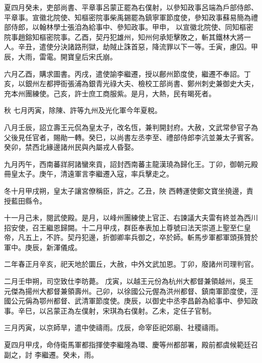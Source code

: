 \begin{pinyinscope}
 夏四月癸未，吏部尚書、平章事呂蒙正罷為右僕射，以參知政事呂端為戶部侍郎、平章事。宣徽北院使、知樞密院事柴禹錫罷為鎮寧軍節度使，參知政事蘇易簡為禮部侍郎，以翰林學士張洎為給事中、參知政事。甲申，
 以宣徽北院使、同知樞密院事趙鎔知樞密院事。乙酉，契丹犯雄州，知州何承矩擊敗之，斬其鐵林大將一人。辛丑，遣使分決諸路刑獄，劫賊止誅首惡，降流罪以下一等。壬寅，慮囚。甲辰，大雨，雷電。開寶皇后宋氏崩。



 六月乙酉，購求圖書。丙戌，遣使諭李繼遷，授以鄜州節度使，繼遷不奉詔。丁亥，以銀州左都押衙張浦為銀青光祿大夫、檢校工部尚書、鄭州刺史兼御史大夫，充本州團練使。己亥，許士庶工商服紫。是月，大熱，民有暍死者。



 秋
 七月丙寅，除陳、許等九州及光化軍今年夏稅。



 八月壬辰，詔立壽王元侃為皇太子，改名恆，兼判開封府。大赦，文武常參官子為父後見任官者，賜勛一轉。癸巳，以尚書左丞李至、禮部侍郎李沆並兼太子賓客。癸卯，禁西北緣邊諸州民與內屬戎人昏娶。



 九月丙午，西南蕃牂牁諸蠻來貢，詔封西南蕃主龍漢𤩊為歸化王。丁卯，御朝元殿冊皇太子。庚午，清遠軍言李繼遷入寇，率兵擊走之。



 冬十月甲戌朔，皇太子讓宮僚稱臣，許之。乙丑，陜
 西轉運使鄭文寶坐撓邊，責授藍田縣令。



 十一月己未，閱武使殿。是月，以峰州團練使上官正、右諫議大夫雷有終並為西川招安使，召王繼恩歸闕。十二月甲戌，群臣奉表加上尊號曰法天崇道上聖至仁皇帝，凡五上，不許。契丹犯邊，折御卿率兵御之，卒於師。斬馬步軍都軍頭孫贊於軍中。庚辰，新渾儀成。



 二年春正月辛亥，祀天地於圜丘，大赦，中外文武加恩。丁卯，廢諸州司理判官。



 二月壬申朔，司空致仕李昉薨。
 戊寅，以越王元份為杭州大都督兼領越州，吳王元傑為揚州大都督兼領壽州。己卯，以徐國公元偓為洪州都督、鎮南軍節度使，涇國公元偁為鄂州都督、武清軍節度使。庚辰，以御史中丞李昌齡為給事中、參知政事。辛巳，以呂蒙正為左僕射，宋琪為右僕射。乙未，定任子官制。



 三月丙寅，以京師旱，遣中使禱雨。戊辰，命宰臣祀郊廟、社稷禱雨。



 夏四月甲戌，命侍衛馬軍都指揮使李繼隆為環、慶等州都部署，殿前都虞候範廷召副之，討
 李繼遷。癸未，雨。




\end{pinyinscope}
